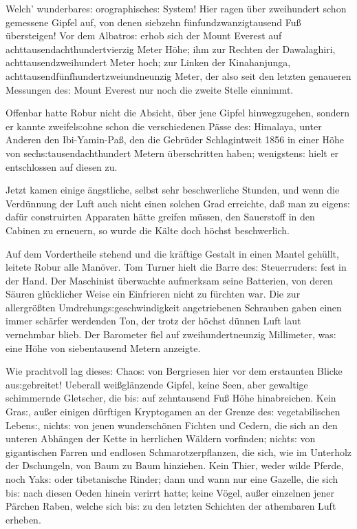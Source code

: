 \documentclass[oneside,12pt]{book}
\newcommand{\s}{s:}
\begin{document}
Welch' wunderbare{\s} orographische{\s} System! Hier ragen \"uber
zweihundert schon gemessene Gipfel auf, von denen siebzehn
f\"unfundzwanzigtausend Fu{\ss} \"ubersteigen! Vor dem
{\glqq}Albatro{\s}{\grqq} erhob sich der Mount Everest auf
achttausendachthundertvierzig Meter H\"ohe; ihm zur Rechten der
Dawalaghiri, achttausendzweihundert Meter hoch; zur Linken der
Kinahanjunga, achttausendf\"unfhundert\/zweiundneunzig Meter, der also
seit den letzten genaueren Messungen de{\s} Mount Everest nur noch
die zweite Stelle einnimmt.

Offenbar hatte Robur nicht die Absicht, \"uber jene Gipfel
hinwegzugehen, sondern er kannte zweifel{\s}ohne schon die
verschiedenen P\"asse de{\s} Himalaya, unter Anderen den
Ibi-Yamin-Pa{\ss}, den die Gebr\"uder Schlagintweit 1856 in einer
H\"ohe von sech{\s}tausendachthundert Metern \"uberschritten haben;
wenigsten{\s} hielt er entschlossen auf diesen zu.

Jetzt kamen einige \"angstliche, selbst sehr beschwerliche Stunden,
und wenn die Verd\"unnung der Luft auch nicht einen solchen Grad
erreichte, da{\ss} man zu eigen{\s} daf\"ur construirten Apparaten
h\"atte greifen m\"ussen, den Sauerstoff in den Cabinen zu erneuern,
so wurde die K\"alte doch h\"ochst beschwerlich.

Auf dem Vordertheile stehend und die kr\"aftige Gestalt in einen
Mantel geh\"ullt, leitete Robur alle Man\"over. Tom Turner hielt die
Barre de{\s} Steuerruder{\s} fest in der Hand. Der Maschinist
\"uberwachte aufmerksam seine Batterien, von deren S\"auren
gl\"ucklicher Weise ein Einfrieren nicht zu f\"urchten war. Die zur
allergr\"o{\ss}ten Umdrehung{\s}geschwindigkeit angetriebenen
Schrauben gaben einen immer sch\"arfer werdenden Ton, der trotz der
h\"ochst d\"unnen Luft laut vernehmbar blieb. Der Barometer fiel auf
zweihundertneunzig Millimeter, wa{\s} eine H\"ohe von siebentausend
Metern anzeigte.

Wie prachtvoll lag diese{\s} Chao{\s} von Bergriesen hier vor dem
erstaunten Blicke au{\s}gebreitet! Ueberall wei{\ss}gl\"anzende
Gipfel, keine Seen, aber gewaltige schimmernde Gletscher, die bi{\s}
auf zehntausend Fu{\ss} H\"ohe hinabreichen. Kein Gra{\s}, au{\ss}er
einigen d\"urftigen Kryptogamen an der Grenze de{\s} vegetabilischen
Leben{\s}, nicht{\s} von jenen wundersch\"onen Fichten und Cedern,
die sich an den unteren Abh\"angen der Kette in herrlichen W\"aldern
vorfinden; nicht{\s} von gigantischen Farren und endlosen
Schmarotzerpflanzen, die sich, wie im Unterholz der Dschungeln, von
Baum zu Baum hinziehen. Kein Thier, weder wilde Pferde, noch Yak{\s}
oder tibetanische Rinder; dann und wann nur eine Gazelle, die sich
bi{\s} nach diesen Oeden hinein verirrt hatte; keine V\"ogel,
au{\ss}er einzelnen jener P\"archen Raben, welche sich bi{\s} zu den
letzten Schichten der athembaren Luft erheben.
\end{document}
